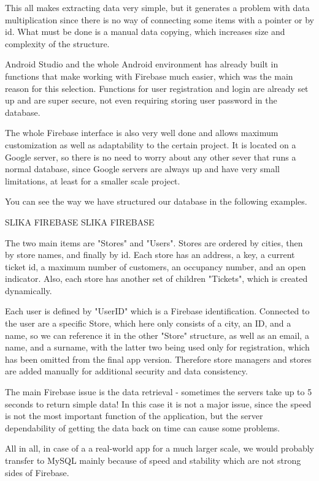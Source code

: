 This all makes extracting data very simple, but it generates a problem with data multiplication since there is no way of connecting some items with a pointer or by id. What must be done is a manual data copying, which increases size and complexity of the structure. \newline

Android Studio and the whole Android environment has already built in functions that make working with Firebase much easier, which was the main reason for this selection. Functions for user registration and login are already set up and are super secure, not even requiring storing user password in the database. \newline

The whole Firebase interface is also very well done and allows maximum customization as well as adaptability to the certain project. It is located on a Google server, so there is no need to worry about any other sever that runs a normal database, since Google servers are always up and have very small limitations, at least for a smaller scale project. \newline

You can see the way we have structured our database in the following examples. 

SLIKA FIREBASE
SLIKA FIREBASE


The two main items are "Stores" and "Users". Stores are ordered by cities, then by store names, and finally by id. Each store has an address, a key, a current ticket id, a maximum number of customers, an occupancy number, and an open indicator. Also, each store has another set of children "Tickets", which is created dynamically. \newline

Each user is defined by "UserID" which is a Firebase identification. Connected to the user are a specific Store, which here only consists of a city, an ID, and a name, so we can reference it in the other "Store" structure, as well as an email, a name, and a surname, with the latter two being used only for registration, which has been omitted from the final app version. Therefore store managers and stores are added manually for additional security and data consistency. \newline

The main Firebase issue is the data retrieval - sometimes the servers take up to 5 seconds to return simple data! In this case it is not a major issue, since the speed is not the most important function of the application, but the server dependability of getting the data back on time can cause some problems. \newline

All in all, in case of a a real-world app for a much larger scale, we would probably transfer to MySQL mainly because of speed and stability which are not strong sides of Firebase. \newline